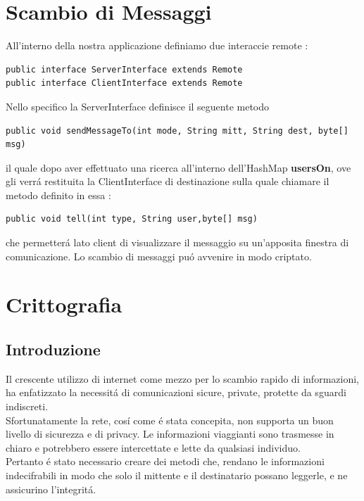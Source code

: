 \documentclass[a4paper, 12 pt, italian]{report}
\begin{document}
\section{Scambio di Messaggi}
All'interno della nostra applicazione definiamo due interaccie remote :

\begin{verbatim}
public interface ServerInterface extends Remote
public interface ClientInterface extends Remote
\end{verbatim}
Nello specifico la ServerInterface definisce il seguente metodo

\begin{verbatim}
public void sendMessageTo(int mode, String mitt, String dest, byte[] msg)
\end{verbatim}
il quale dopo aver effettuato una ricerca all'interno dell'HashMap \textbf{usersOn}, ove gli verr\'a restituita la ClientInterface di destinazione sulla quale chiamare il metodo definito in essa :
\begin{verbatim}
public void tell(int type, String user,byte[] msg)
\end{verbatim}
che permetter\'a lato client di visualizzare il messaggio su un'apposita finestra di comunicazione. Lo scambio di messaggi pu\'o avvenire in modo criptato.

\section{Crittografia}
\subsection{Introduzione}
Il crescente utilizzo di internet come mezzo per lo scambio rapido di informazioni, ha enfatizzato la necessit\'a di comunicazioni sicure, private, protette da sguardi indiscreti. \\
Sfortunatamente la rete, cos\'i come \'e stata concepita, non supporta un buon livello di sicurezza e di privacy. Le informazioni viaggianti sono trasmesse in chiaro e potrebbero essere intercettate e lette da qualsiasi individuo. \\
Pertanto  \'e stato necessario creare dei metodi che, rendano le informazioni indecifrabili in modo che solo il mittente e il destinatario possano leggerle, e ne assicurino l'integrit\'a.
\end{document}
